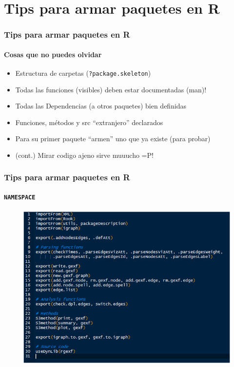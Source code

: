 \documentclass{beamer}\usepackage{graphicx, color}
\begin{document}

\section{Tips para armar paquetes en R}
\begin{frame}
\frametitle{Tips para armar paquetes en R}
\framesubtitle{Cosas que no puedes olvidar}
\begin{itemize}[<+->]
\item Estructura de carpetas ({\tt ?package.skeleton})
\item Todas las funciones (visibles) deben estar documentadas (man)!
\item Todas las Dependencias (a otros paquetes) bien definidas
\item Funciones, m\'etodos y src ``extranjero'' declarados
\item Para su primer paquete ``armen'' uno que ya existe (para probar)
\item (cont.) Mirar codigo ajeno sirve muuucho =P!
\end{itemize}
\end{frame}

\begin{frame}
\frametitle{Tips para armar paquetes en R}
\framesubtitle{{\tt NAMESPACE}}
\begin{figure}
\includegraphics[height=.6\linewidth]{namespace}
\end{figure}
\end{frame}
\end{document}
